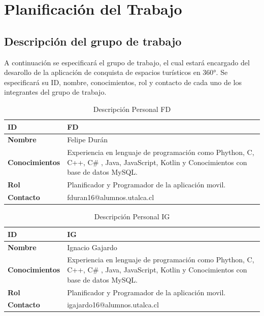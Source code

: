 \section{Planificación del Trabajo}

\subsection{Descripción del grupo de trabajo}
A continuación se especificará el grupo de trabajo, el cual estará encargado del desarollo de la aplicación de conquista de espacios turísticos en 360°. Se especificará su ID, nombre, conocimientos, rol y contacto de cada uno de los integrantes del grupo de trabajo.

\begin{table}[H]
    \centering
        \begin{tabular}{|l | p{12cm} |}        
        \hline
        \textbf{ID} & FD \\
        \hline
        \textbf{Nombre} & Felipe Durán \\
        \hline
        \textbf{Conocimientos} & Experiencia en lenguaje de programación como Phython, C, C++, C\# , Java, JavaScript, Kotlin y Conocimientos con base de datos MySQL. \\
        \hline
        \textbf{Rol} & Planificador y Programador de la aplicación movil. \\    
        \hline
        \textbf{Contacto} & fduran16@alumnos.utalca.cl \\
        \hline            
        \end{tabular}
    \caption{Descripción Personal FD}
\end{table}


\begin{table}[H]
    \centering
        \begin{tabular}{|l | p{12cm} |}        
        \hline
        \textbf{ID} & IG \\
        \hline
        \textbf{Nombre} & Ignacio Gajardo \\
        \hline
        \textbf{Conocimientos} & Experiencia en lenguaje de programación como Phython, C, C++, C\# , Java, JavaScript, Kotlin y Conocimientos con base de datos MySQL. \\
        \hline
        \textbf{Rol} & Planificador y Programador de la aplicación movil. \\    
        \hline
        \textbf{Contacto} & igajardo16@alumnos.utalca.cl \\
        \hline            
        \end{tabular}
    \caption{Descripción Personal IG}
\end{table}


